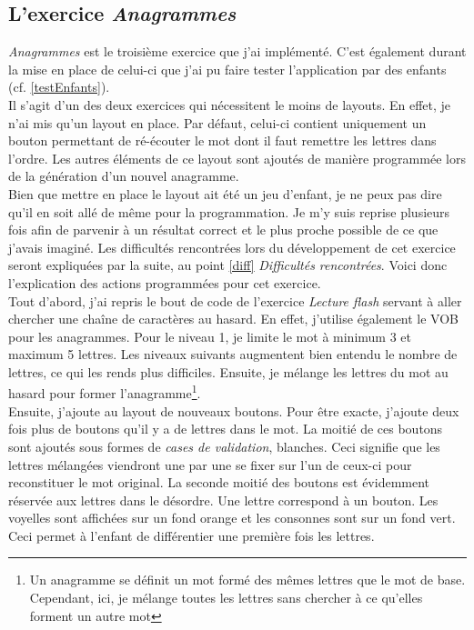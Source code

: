 \subsection{L'exercice \textit{Anagrammes}}
\textit{Anagrammes} est le troisième exercice que j'ai implémenté. C'est également durant la mise en place de celui-ci que j'ai pu faire tester l'application par des enfants (cf. \ref{testEnfants}).\\

Il s'agit d'un des deux exercices qui nécessitent le moins de layouts. En effet, je n'ai mis qu'un layout en place. Par défaut, celui-ci contient uniquement un bouton permettant de ré-écouter le mot dont il faut remettre les lettres dans l'ordre. Les autres éléments de ce layout sont ajoutés de manière programmée lors de la génération d'un nouvel anagramme.\\

Bien que mettre en place le layout ait été un jeu d'enfant, je ne peux pas dire qu'il en soit allé de même pour la programmation. Je m'y suis reprise plusieurs fois afin de parvenir à un résultat correct et le plus proche possible de ce que j'avais imaginé. Les difficultés rencontrées lors du développement de cet exercice seront expliquées par la suite, au point \ref{diff} \textit{Difficultés rencontrées}. Voici donc l'explication des actions programmées pour cet exercice.\\

Tout d'abord, j'ai repris le bout de code de l'exercice \textit{Lecture flash} servant à aller chercher une chaîne de caractères au hasard. En effet, j'utilise également le VOB pour les anagrammes. Pour le niveau 1, je limite le mot à minimum 3 et maximum 5 lettres. Les niveaux suivants augmentent bien entendu le nombre de lettres, ce qui les rends plus difficiles. Ensuite, je mélange les lettres du mot au hasard pour former l'anagramme\footnote{Un anagramme se définit un mot formé des mêmes lettres que le mot de base. Cependant, ici, je mélange toutes les lettres sans chercher à ce qu'elles forment un autre mot}.\\

Ensuite, j'ajoute au layout de nouveaux boutons. Pour être exacte, j'ajoute deux fois plus de boutons qu'il y a de lettres dans le mot. La moitié de ces boutons sont ajoutés sous formes de \textit{cases de validation}, blanches. Ceci signifie que les lettres mélangées viendront une par une se fixer sur l'un de ceux-ci pour reconstituer le mot original. La seconde moitié des boutons est évidemment réservée aux lettres dans le désordre. Une lettre correspond à un bouton. Les voyelles sont affichées sur un fond orange et les consonnes sont sur un fond vert. Ceci permet à l'enfant de différentier une première fois les lettres.\\

